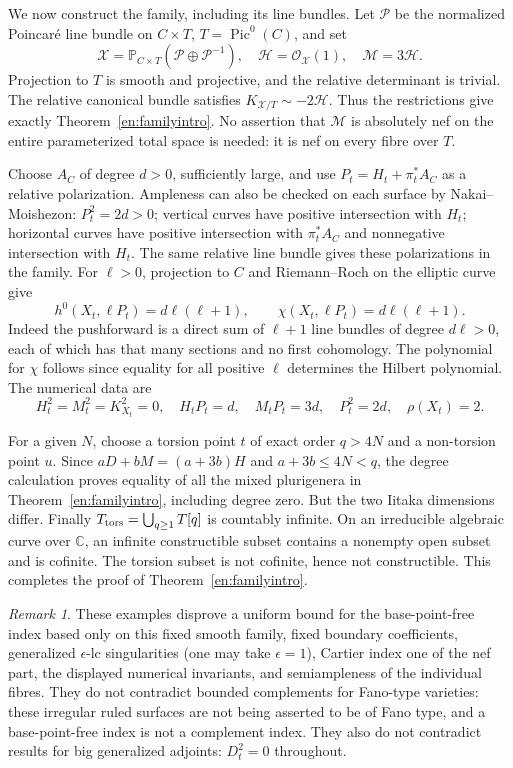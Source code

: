 \documentclass[12pt]{amsart}
\theoremstyle{definition}
\theoremstyle{remark}
\newtheorem{rem}[thm]{Remark}
\numberwithin{equation}{section}
\newcommand{\cO}{\mathcal{O}}
\newcommand{\cP}{\mathcal{P}}
\newcommand{\C}{\mathbb{C}}
\newcommand{\mP}{\mathbb{P}}
\DeclareMathOperator{\Pic}{Pic}
\begin{document}
We now construct the family, including its line bundles. Let $\cP$ be the normalized Poincar\'e line bundle on $C\times T$, $T=\Pic^0(C)$, and set
\[
 \mathscr X=\mP_{C\times T}(\cP\oplus\cP^{-1}),\quad
 \mathscr H=\cO_{\mathscr X}(1),\quad \mathscr M=3\mathscr H.
\]
Projection to $T$ is smooth and projective, and the relative determinant is trivial. The relative canonical bundle satisfies $K_{\mathscr X/T}\sim-2\mathscr H$. Thus the restrictions give exactly Theorem~\ref{en:familyintro}. No assertion that $\mathscr M$ is absolutely nef on the entire parameterized total space is needed: it is nef on every fibre over $T$.

Choose $A_C$ of degree $d>0$, sufficiently large, and use $P_t=H_t+\pi_t^*A_C$ as a relative polarization. Ampleness can also be checked on each surface by Nakai--Moishezon: $P_t^2=2d>0$; vertical curves have positive intersection with $H_t$; horizontal curves have positive intersection with $\pi_t^*A_C$ and nonnegative intersection with $H_t$. The same relative line bundle gives these polarizations in the family. For $\ell>0$, projection to $C$ and Riemann--Roch on the elliptic curve give
\begin{equation}\label{en:hilbert}
 h^0(X_t,\ell P_t)=d\ell(\ell+1),\qquad
 \chi(X_t,\ell P_t)=d\ell(\ell+1).
\end{equation}
Indeed the pushforward is a direct sum of $\ell+1$ line bundles of degree $d\ell>0$, each of which has that many sections and no first cohomology. The polynomial for $\chi$ follows since equality for all positive $\ell$ determines the Hilbert polynomial. The numerical data are
\[
 H_t^2=M_t^2=K_{X_t}^2=0,\quad
 H_tP_t=d,\quad M_tP_t=3d,\quad P_t^2=2d,\quad\rho(X_t)=2.
\]

For a given $N$, choose a torsion point $t$ of exact order $q>4N$ and a non-torsion point $u$. Since $aD+bM=(a+3b)H$ and $a+3b\leq4N<q$, the degree calculation proves equality of all the mixed plurigenera in Theorem~\ref{en:familyintro}, including degree zero. But the two Iitaka dimensions differ. Finally $T_{\rm tors}=\bigcup_{q\geq1}T[q]$ is countably infinite. On an irreducible algebraic curve over $\C$, an infinite constructible subset contains a nonempty open subset and is cofinite. The torsion subset is not cofinite, hence not constructible. This completes the proof of Theorem~\ref{en:familyintro}.

\begin{rem}\label{en:bounded}
These examples disprove a uniform bound for the base-point-free index based only on this fixed smooth family, fixed boundary coefficients, generalized $\epsilon$-lc singularities (one may take $\epsilon=1$), Cartier index one of the nef part, the displayed numerical invariants, and semiampleness of the individual fibres. They do not contradict bounded complements for Fano-type varieties: these irregular ruled surfaces are not being asserted to be of Fano type, and a base-point-free index is not a complement index. They also do not contradict results for big generalized adjoints: $D_t^2=0$ throughout.
\end{rem}
\end{document}
